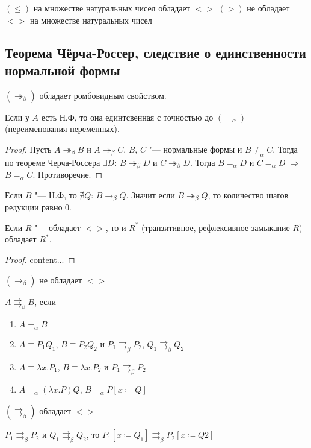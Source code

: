 \begin{example}
	$(\leq)$ на множестве натуральных чисел обладает $<>$
	$(>)$ не обладает $<>$ на множестве натуральных чисел 
\end{example}

\subsection{Теорема Чёрча-Россер, следствие о единственности нормальной формы}

\begin{theorem}
	$(\twoheadrightarrow_{\beta})$ обладает ромбовидным свойством.
\end{theorem}


\begin{cons}
	Если у $A$ есть Н.Ф, то она единтсвенная с точностью до $(=_{\alpha})$ (переименования переменных).
\end{cons}

\begin{proof}
	Пусть $A\twoheadrightarrow_{\beta}B$ и $A\twoheadrightarrow_{\beta}C$. $B$, $C$ "--- нормальные формы и $B\neq_{\alpha}C$. 
	Тогда по теореме Черча-Россера $\exists{}D$: $B\twoheadrightarrow_{\beta}D$ и $C\twoheadrightarrow_{\beta}D$. Тогда $B=_{\alpha}D$ и $C=_{\alpha} D$ $\Rightarrow$ $B=_{\alpha}C$. Противоречие.
\end{proof}

\begin{lemma}
	Если $B$ "--- Н.Ф, то $\nexists{}Q$: $B\to_{\beta}Q$. Значит если $B\twoheadrightarrow_{\beta}Q$, то количество шагов редукции равно 0.
\end{lemma}

\begin{lemma}
	Если $R$ "--- обладает $<>$, то и $R^{*}$ (транзитивное, рефлексивное замыкание $R$) обладает $R^{*}$.
\end{lemma}

\begin{proof}
	content...
\end{proof}

\begin{lemma}
	$(\to_{\beta})$ не обладает $<>$
\end{lemma}

\begin{definition}
	$A\rightrightarrows_{\beta}B$, если
	\begin{enumerate}
		\item $A=_{\alpha}B$
		\item $A\equiv{}P_{1}Q_{1}$, $B\equiv{}P_{2}Q_{2}$ и $P_{1}\rightrightarrows_{\beta}P_{2}$, $Q_{1}\rightrightarrows_{\beta}Q_{2}$
		\item $A\equiv{}\lambda{}x.P_{1}$, $B\equiv{}\lambda{}x.P_{2}$ и 
		$P_{1}\rightrightarrows_{\beta}P_{2}$
		\item $A=_{\alpha}(\lambda{}x.P)Q$, $B=_{\alpha}P[x\coloneqq{}Q]$
	\end{enumerate}
\end{definition}

\begin{lemma}
	$(\rightrightarrows_{\beta})$ обладает $<>$
\end{lemma}

$P_{1}\rightrightarrows_{\beta}P_{2}$ и $Q_{1}\rightrightarrows_{\beta}Q_{2}$, то $P_{1}[x\coloneqq{}Q_{1}]\rightrightarrows_{\beta}P_{2}[x\coloneqq{}Q2]$
